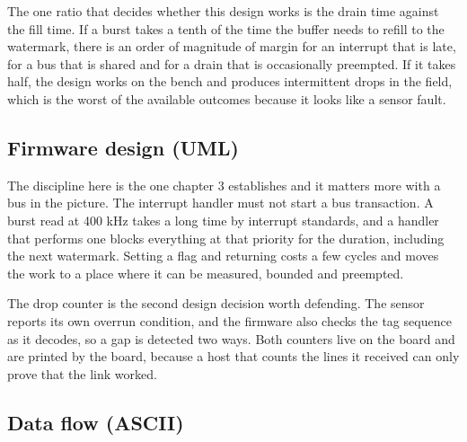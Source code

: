 The one ratio that decides whether this design works is the drain time against
the fill time. If a burst takes a tenth of the time the buffer needs to refill
to the watermark, there is an order of magnitude of margin for an interrupt that
is late, for a bus that is shared and for a drain that is occasionally preempted.
If it takes half, the design works on the bench and produces intermittent drops
in the field, which is the worst of the available outcomes because it looks like
a sensor fault.

\subsection*{Firmware design (UML)}


The discipline here is the one chapter 3 establishes and it matters more with a
bus in the picture. The interrupt handler must not start a bus transaction. A
burst read at 400 kHz takes a long time by interrupt standards, and a handler
that performs one blocks everything at that priority for the duration, including
the next watermark. Setting a flag and returning costs a few cycles and moves
the work to a place where it can be measured, bounded and preempted.

The drop counter is the second design decision worth defending. The sensor
reports its own overrun condition, and the firmware also checks the tag sequence
as it decodes, so a gap is detected two ways. Both counters live on the board
and are printed by the board, because a host that counts the lines it received
can only prove that the link worked.

\subsection*{Data flow (ASCII)}

